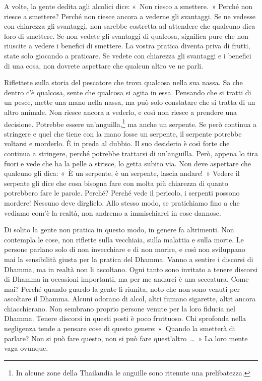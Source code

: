 A volte, la gente dedita agli alcolici dice: «~Non riesco a smettere.~»
Perché non riesce a smettere? Perché non riesce ancora a vederne gli
svantaggi. Se ne vedesse con chiarezza gli svantaggi, non sarebbe
costretta ad attendere che qualcuno dica loro di smettere. Se non vedete
gli svantaggi di qualcosa, significa pure che non riuscite a vedere i
benefici di smettere. La vostra pratica diventa priva di frutti, state
solo giocando a praticare. Se vedete con chiarezza gli svantaggi e i
benefici di una cosa, non dovrete aspettare che qualcun altro ve ne
parli.

Riflettete sulla storia del pescatore che trova qualcosa nella sua
nassa. Sa che dentro c'è qualcosa, sente che qualcosa si agita in essa.
Pensando che si tratti di un pesce, mette una mano nella nassa, ma può
solo constatare che si tratta di un altro animale. Non riesce ancora a
vederlo, e così non riesce a prendere una decisione. Potrebbe essere
un'anguilla,\footnote{In alcune zone della Thailandia le anguille sono
  ritenute una prelibatezza.} ma anche un serpente. Se però continua a
stringere e quel che tiene con la mano fosse un serpente, il serpente
potrebbe voltarsi e morderlo. È in preda al dubbio. Il suo desiderio è
così forte che continua a stringere, perché potrebbe trattarsi di
un'anguilla. Però, appena lo tira fuori e vede che ha la pelle a
strisce, lo getta subito via. Non deve aspettare che qualcuno gli dica:
«~È un serpente, è un serpente, lascia andare!~» Vedere il serpente gli
dice che cosa bisogna fare con molta più chiarezza di quanto potrebbero
fare le parole. Perché? Perché vede il pericolo, i serpenti possono
mordere! Nessuno deve dirglielo. Allo stesso modo, se pratichiamo fino a
che vediamo com'è la realtà, non andremo a immischiarci in cose dannose.

Di solito la gente non pratica in questo modo, in genere fa altrimenti.
Non contempla le cose, non riflette sulla vecchiaia, sulla malattia e
sulla morte. Le persone parlano solo di non invecchiare e di non morire,
e così non sviluppano mai la sensibilità giusta per la pratica del
Dhamma. Vanno a sentire i discorsi di Dhamma, ma in realtà non li
ascoltano. Ogni tanto sono invitato a tenere discorsi di Dhamma in
occasioni importanti, ma per me andarci è una seccatura. Come mai?
Perché quando guardo la gente lì riunita, noto che non sono venuti per
ascoltare il Dhamma. Alcuni odorano di alcol, altri fumano sigarette,
altri ancora chiacchierano. Non sembrano proprio persone venute per la
loro fiducia nel Dhamma. Tenere discorsi in questi posti è poco
fruttuoso. Chi sprofonda nella negligenza tende a pensare cose di questo
genere: «~Quando la smetterà di parlare? Non si può fare questo, non si
può fare quest'altro~\ldots{}~» La loro mente vaga ovunque.

